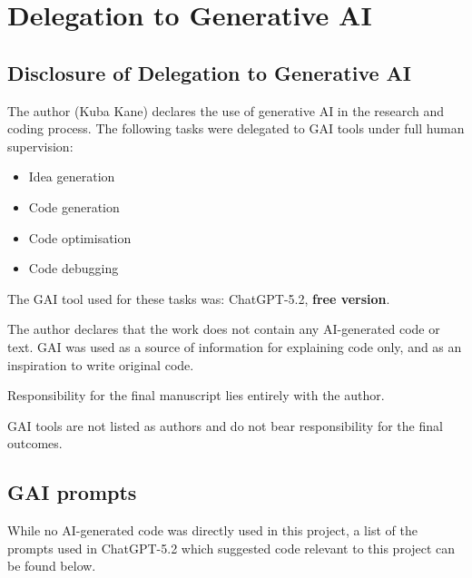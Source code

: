 \documentclass[11pt, letterpaper]{article}
\begin{document}
\newpage
\section{Delegation to Generative AI}
\subsection{Disclosure of Delegation to Generative AI}
The author (Kuba Kane) declares the use of generative AI in the research and coding process. The following tasks were delegated to GAI tools under full human supervision:

\begin{itemize}
	\item Idea generation
	\item Code generation
	\item Code optimisation
	\item Code debugging
\end{itemize}

The GAI tool used for these tasks was: ChatGPT-5.2, \textbf{free version}.

The author declares that the work does not contain any AI-generated code or text. GAI was used as a source of information for explaining code only, and as an inspiration to write original code. 

Responsibility for the final manuscript lies entirely with the author.

GAI tools are not listed as authors and do not bear responsibility for the final outcomes.

\subsection{GAI prompts}
While no AI-generated code was directly used in this project, a list of the prompts used in ChatGPT-5.2 which suggested code relevant to this project can be found below.
\end{document}
